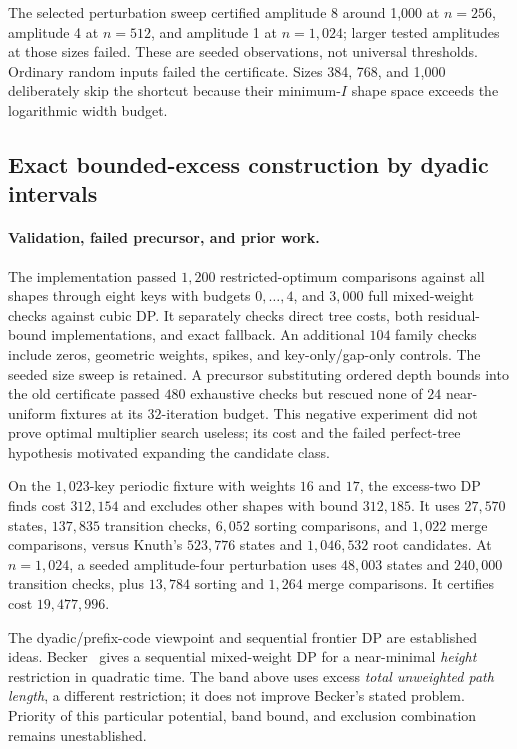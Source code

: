 \documentclass[11pt]{article}
\begin{document}
The selected perturbation sweep certified amplitude 8 around 1,000 at
$n=256$, amplitude 4 at $n=512$, and amplitude 1 at $n=1,024$; larger tested
amplitudes at those sizes failed. These are seeded observations, not
universal thresholds. Ordinary random inputs failed the certificate.
Sizes 384, 768, and 1,000 deliberately skip the shortcut because their
minimum-$I$ shape space exceeds the logarithmic width budget.




\subsection{Exact bounded-excess construction by dyadic intervals}
\paragraph{Validation, failed precursor, and prior work.}
The implementation passed $1{,}200$ restricted-optimum comparisons against
all shapes through eight keys with budgets $0,\ldots,4$, and $3{,}000$
full mixed-weight checks against cubic DP. It separately checks direct
tree costs, both residual-bound implementations, and exact fallback.
An additional $104$ family checks include zeros, geometric weights,
spikes, and key-only/gap-only controls. The seeded size sweep is retained.
A precursor substituting ordered depth bounds into the old certificate
passed $480$ exhaustive checks but rescued none of $24$ near-uniform
fixtures at its $32$-iteration budget. This negative experiment did not
prove optimal multiplier search useless; its cost and the failed
perfect-tree hypothesis motivated expanding the candidate class.

On the $1{,}023$-key periodic fixture with weights $16$ and $17$, the
excess-two DP finds cost $312{,}154$ and excludes other shapes with bound
$312{,}185$. It uses $27{,}570$ states, $137{,}835$ transition checks,
$6{,}052$ sorting comparisons, and $1{,}022$ merge comparisons, versus
Knuth's $523{,}776$ states and $1{,}046{,}532$ root candidates.
At $n=1{,}024$, a seeded amplitude-four perturbation uses $48{,}003$ states
and $240{,}000$ transition checks, plus $13{,}784$ sorting and $1{,}264$
merge comparisons. It certifies cost $19{,}477{,}996$.



The dyadic/prefix-code viewpoint and sequential frontier DP are established
ideas. Becker~\cite{becker} gives a sequential mixed-weight DP for a
near-minimal \emph{height} restriction in quadratic time. The band above
uses excess \emph{total unweighted path length}, a different restriction;
it does not improve Becker's stated problem. Priority of this particular
potential, band bound, and exclusion combination remains unestablished.
\end{document}
